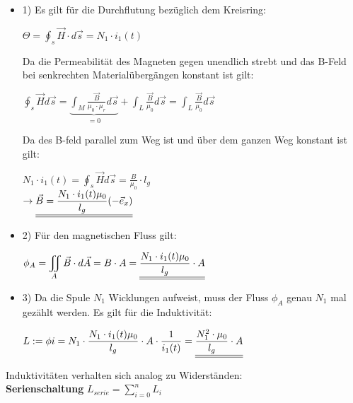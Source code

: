 
\beginbsp
\begin{itemize}
	\item 1) Es gilt für die Durchflutung bezüglich dem Kreisring:
	      \begin{center}
	      	$\Theta =  \oint_s \vec{H}\cdot d\vec{s} = N_1\cdot i_1(t)$
	      \end{center}
	      Da die Permeabilität des Magneten gegen unendlich strebt und das B-Feld bei senkrechten Materialübergängen konstant ist gilt: \\

	      \begin{center}
	      	$\displaystyle \oint_s \vec{H} d\vec{s} = \underbrace{\int_{M} \frac{\vec{B}}{\mu_0 \cdot \mu_r} d\vec{s}}_{=0} + \int_{L} \frac{\vec{B}}{\mu_0} d\vec{s} = \int_{L} \frac{\vec{B}}{\mu_0} d\vec{s} $
	      \end{center}
	      Da des B-feld parallel zum Weg ist und über dem ganzen Weg konstant ist gilt:
	      \begin{center}
	      	$\displaystyle N_1 \cdot i_1(t) = \displaystyle \oint_s \vec{H} d\vec{s} = \frac{B}{\mu_0} \cdot l_g$ \\
	      	$\displaystyle \rightarrow \underline{\underline{\vec{B} = \frac{N_1 \cdot i_1(t) \mu_0}{l_g} (-\vec{e}_x)}}$
	      \end{center}

	\item 2) Für den magnetischen Fluss gilt:
	      \begin{center}
	      	$\displaystyle \phi_A = \iint_A \vec{B} \cdot d\vec{A} = B \cdot A =\underline{\underline{\frac{N_1 \cdot i_1(t) \mu_0}{l_g} \cdot A}}$
	      \end{center}

	\item 3) Da die Spule $N_1$ Wicklungen aufweist, muss der Fluss $\phi_A$ genau $N_1$ mal gezählt werden. Es gilt für die Induktivität:
	      \begin{center}
	      	$ \displaystyle L:= {\phi}{i} = N_1 \cdot  \frac{N_1 \cdot i_1(t) \mu_0}{l_g} \cdot A \cdot \frac{1}{i_1(t)} =  \underline{\underline{\frac{N_1^2 \cdot \mu_0}{l_g} \cdot A}}$
	      \end{center}
\end{itemize}

\iend




\beginip
Induktivitäten verhalten sich analog zu Widerständen: \\
\textbf{Serienschaltung}
\formulaBegin
$ L_{serie} = \sum_{i=0}^n L_i $
\formulaEnd


